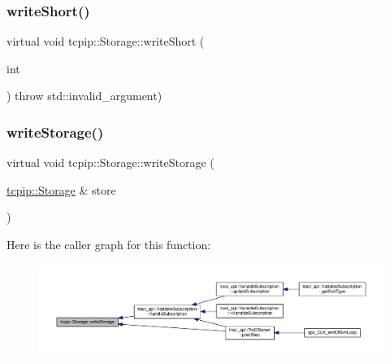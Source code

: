 \mbox{\label{classtcpip_1_1_storage_ae7af58d12716f7119877efb7919813f4}} 
\subsubsection{\texorpdfstring{write\+Short()}{writeShort()}}
{\footnotesize\ttfamily virtual void tcpip\+::\+Storage\+::write\+Short (\begin{DoxyParamCaption}\item[{int}]{ }\end{DoxyParamCaption}) throw  std\+::invalid\+\_\+argument) \hspace{0.3cm}{\ttfamily [virtual]}}

\mbox{\label{classtcpip_1_1_storage_af574cbcecfb20c5525d579cd4a0bac8f}} 
\subsubsection{\texorpdfstring{write\+Storage()}{writeStorage()}}
{\footnotesize\ttfamily virtual void tcpip\+::\+Storage\+::write\+Storage (\begin{DoxyParamCaption}\item[{\hyperlink{classtcpip_1_1_storage}{tcpip\+::\+Storage} \&}]{store }\end{DoxyParamCaption})\hspace{0.3cm}{\ttfamily [virtual]}}

Here is the caller graph for this function\+:
\nopagebreak
\begin{figure}[H]
\begin{center}
\leavevmode
\includegraphics[width=350pt]{classtcpip_1_1_storage_af574cbcecfb20c5525d579cd4a0bac8f_icgraph}
\end{center}
\end{figure}
\mbox{\label{classtcpip_1_1_storage_a07b6d4f8db8f1893aa4ed419be5a5d25}} 
